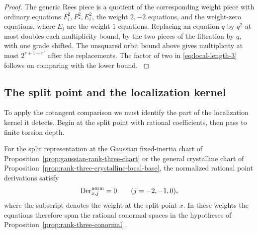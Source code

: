 \begin{proof}
The generic Rees
piece is a quotient of the corresponding weight piece
with ordinary equations \(F_i^2,F_*^2,E_i^2\), the
weight \(2,-2\) equations, and the weight-zero
equations, where \(E_i\) are the weight \(1\) equations.
Replacing an equation \(q\) by \(q^2\) at most doubles
each multiplicity bound, by the two pieces of the
filtration by \(q\), with one grade shifted. The
unsquared orbit bound above gives multiplicity at
most \(2^{r+1+r'}\) after the replacements. The factor
of two in \eqref{eq:local-length-3} follows on comparing with the lower bound.
\label{cor:ordinary-rank-three-length-1}

\end{proof}

\subsection{The split point and the localization kernel}

To apply the cotangent comparison we must identify the part of the localization kernel
it detects. Begin at the split point with rational coefficients, then pass to finite
torsion depth.

\begin{lemma}
\label{lem:rank-three-split-vanishing}
For the split representation at the Gaussian fixed-inertia chart of
Proposition~\ref{prop:gaussian-rank-three-chart} or the general
crystalline chart of Proposition~\ref{prop:rank-three-crystalline-local-base}, the normalized rational point derivations satisfy 
\[
 \operatorname{Der}_{x,j}^{\rm norm}=0\qquad(j=-2,-1,0),
\]
 where the subscript denotes the weight at the split point \(x\). In these
weights the equations therefore span the rational conormal
spaces in the hypotheses of Proposition~\ref{prop:rank-three-conormal}.
\end{lemma}

